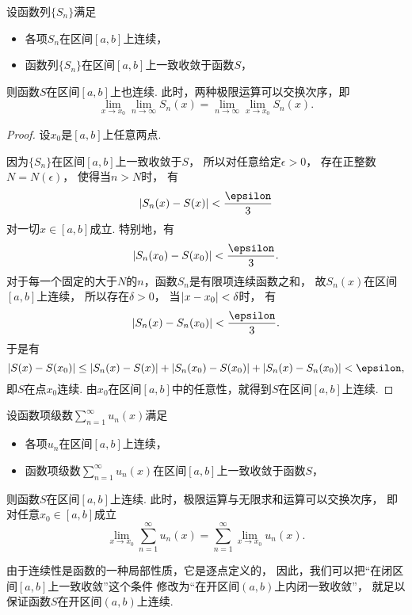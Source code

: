 \begin{theorem}\label{theorem:函数项级数.连续函数列的一致收敛性保证极限函数的连续性}
设函数列\(\{S_n\}\)满足\begin{itemize}
	\item 各项\(S_n\)在区间\([a,b]\)上连续，
	\item 函数列\(\{S_n\}\)在区间\([a,b]\)上一致收敛于函数\(S\)，
\end{itemize}
则函数\(S\)在区间\([a,b]\)上也连续.
此时，两种极限运算可以交换次序，即\[
	\lim_{x \to x_0} \lim_{n\to\infty} S_n(x)
	= \lim_{n\to\infty} \lim_{x \to x_0} S_n(x).
\]
\begin{proof}
设\(x_0\)是\([a,b]\)上任意两点.

因为\(\{S_n\}\)在区间\([a,b]\)上一致收敛于\(S\)，
所以对任意给定\(\epsilon>0\)，
存在正整数\(N = N(\epsilon)\)，
使得当\(n>N\)时，
有\[
	\abs{S_n(x) - S(x)} < \frac\epsilon3
\]对一切\(x\in[a,b]\)成立.
特别地，有\[
	\abs{S_n(x_0) - S(x_0)} < \frac\epsilon3.
\]
对于每一个固定的大于\(N\)的\(n\)，函数\(S_n\)是有限项连续函数之和，
故\(S_n(x)\)在区间\([a,b]\)上连续，
所以存在\(\delta>0\)，
当\(\abs{x - x_0} < \delta\)时，
有\[
	\abs{S_n(x) - S_n(x_0)} < \frac\epsilon3.
\]
于是有\[
	\abs{S(x) - S(x_0)}
	\leq \abs{S_n(x) - S(x)}
		+ \abs{S_n(x_0) - S(x_0)}
		+ \abs{S_n(x) - S_n(x_0)}
	< \epsilon,
\]
即\(S\)在点\(x_0\)连续.
由\(x_0\)在区间\([a,b]\)中的任意性，就得到\(S\)在区间\([a,b]\)上连续.
\end{proof}
\end{theorem}
\begin{theorem}
设函数项级数\(\sum_{n=1}^\infty u_n(x)\)满足\begin{itemize}
	\item 各项\(u_n\)在区间\([a,b]\)上连续，
	\item 函数项级数\(\sum_{n=1}^\infty u_n(x)\)在区间\([a,b]\)上一致收敛于函数\(S\)，
\end{itemize}
则函数\(S\)在区间\([a,b]\)上连续.
此时，极限运算与无限求和运算可以交换次序，
即对任意\(x_0\in[a,b]\)成立\[
	\lim_{x \to x_0} \sum_{n=1}^\infty u_n(x)
	= \sum_{n=1}^\infty \lim_{x \to x_0} u_n(x).
\]
\end{theorem}
由于连续性是函数的一种局部性质，它是逐点定义的，
因此，我们可以把“在闭区间\([a,b]\)上一致收敛”这个条件
修改为“在开区间\((a,b)\)上内闭一致收敛”，
就足以保证函数\(S\)在开区间\((a,b)\)上连续.
